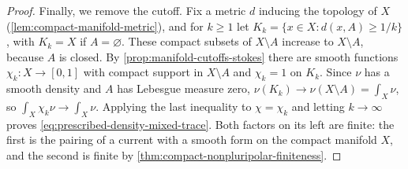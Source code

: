 \begin{proof}
Finally, we remove the cutoff. Fix a metric $d$ inducing the topology of $X$ (\cref{lem:compact-manifold-metric}), and for $k\geq1$ let $K_k=\{x\in X:d(x,A)\geq1/k\}$, with $K_k=X$ if $A=\varnothing$. These compact subsets of $X\setminus A$ increase to $X\setminus A$, because $A$ is closed. By \cref{prop:manifold-cutoffs-stokes} there are smooth functions $\chi_k\colon X\to[0,1]$ with compact support in $X\setminus A$ and $\chi_k=1$ on $K_k$. Since $\nu$ has a smooth density and $A$ has Lebesgue measure zero, $\nu(K_k)\to\nu(X\setminus A)=\int_X\nu$, so $\int_X\chi_k\nu\to\int_X\nu$. Applying the last inequality to $\chi=\chi_k$ and letting $k\to\infty$ proves \eqref{eq:prescribed-density-mixed-trace}. Both factors on its left are finite: the first is the pairing of a current with a smooth form on the compact manifold $X$, and the second is finite by \cref{thm:compact-nonpluripolar-finiteness}.
\end{proof}

